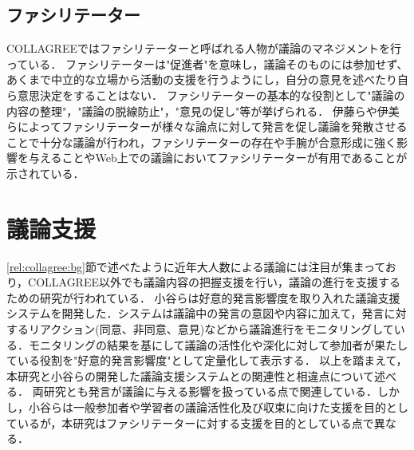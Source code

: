 \subsection{ファシリテーター}
COLLAGREEではファシリテーターと呼ばれる人物が議論のマネジメントを行っている．
ファシリテーターは"促進者"を意味し，議論そのものには参加せず、あくまで中立的な立場から活動の支援を行うようにし，自分の意見を述べたり自ら意思決定をすることはない．
ファシリテーターの基本的な役割として"議論の内容の整理"，"議論の脱線防止"，"意見の促し"等が挙げられる．
伊藤ら\cite{facilitation}や伊美ら\cite{collagree_Experiment}によってファシリテーターが様々な論点に対して発言を促し議論を発散させることで十分な議論が行われ，ファシリテーターの存在や手腕が合意形成に強く影響を与えることやWeb上での議論においてファシリテーターが有用であることが示されている．

\section{議論支援}
\label{rel:argSupport}
\ref{rel:collagree:bg}節で述べたように近年大人数による議論には注目が集まっており，COLLAGREE以外でも議論内容の把握支援を行い，議論の進行を支援するための研究が行われている．
小谷ら\cite{discSupport2}は好意的発言影響度を取り入れた議論支援システムを開発した．システムは議論中の発言の意図や内容に加えて，発言に対するリアクション(同意、非同意、意見)などから議論進行をモニタリングしている．モニタリングの結果を基にして議論の活性化や深化に対して参加者が果たしている役割を"好意的発言影響度"として定量化して表示する．
以上を踏まえて，本研究と小谷らの開発した議論支援システムとの関連性と相違点について述べる．
両研究とも発言が議論に与える影響を扱っている点で関連している．しかし，小谷らは一般参加者や学習者の議論活性化及び収束に向けた支援を目的としているが，本研究はファシリテーターに対する支援を目的としている点で異なる．
